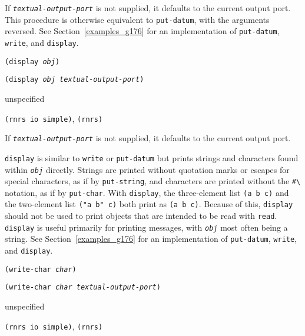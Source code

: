 If \texttt{\textit{textual-output-port}} is not supplied, it defaults to the current output port.
This procedure is otherwise equivalent to \texttt{put-datum}, with the
arguments reversed.
See Section \ref{examples_g176} for an implementation of \texttt{put-datum},
\texttt{write}, and \texttt{display}.

\begin{description}

\label{io_s85}\item[procedure] \texttt{(display \textit{obj})}



\item[procedure] \texttt{(display \textit{obj} \textit{textual-output-port})}



\item[returns] unspecified


\item[libraries] \texttt{(rnrs io simple)}, \texttt{(rnrs)}
\end{description}


If \texttt{\textit{textual-output-port}} is not supplied, it defaults to the current output port.

\texttt{display} is similar to \texttt{write} or \texttt{put-datum} but prints strings
and characters found within \texttt{\textit{obj}} directly.
Strings are printed without quotation marks or escapes for special characters, as if
by \texttt{put-string}, and characters
are printed without the \texttt{\#{}\textbackslash{}} notation, as if by \texttt{put-char}.
With \texttt{display},
the three-element list \texttt{(a b c)}
and the two-element list \texttt{("a b" c)} both print as
\texttt{(a b c)}.
Because of this, \texttt{display} should not be used to print objects that
are intended to be read with \texttt{read}.
\texttt{display} is useful primarily for printing messages, with \texttt{\textit{obj}}
most often being a string.
See Section \ref{examples_g176} for an implementation of \texttt{put-datum},
\texttt{write}, and \texttt{display}.
\begin{description}

\label{io_s86}\item[procedure] \texttt{(write-char \textit{char})}



\item[procedure] \texttt{(write-char \textit{char} \textit{textual-output-port})}



\item[returns] unspecified


\item[libraries] \texttt{(rnrs io simple)}, \texttt{(rnrs)}
\end{description}


